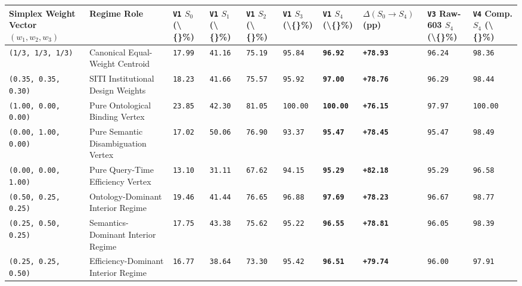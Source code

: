 \documentclass[10pt,a4paper]{article}
\begin{document}
{\scriptsize
\begin{longtable}{p{}p{}p{}p{}p{}p{}p{}p{}p{}p{}}
\toprule
\textbf{Simplex Weight Vector $(w_1, w_2, w_3)$} & \textbf{Regime Role} & \textbf{\texttt{V1} $S_0$ (\textbackslash\{\}\%)} & \textbf{\texttt{V1} $S_1$ (\textbackslash\{\}\%)} & \textbf{\texttt{V1} $S_2$ (\textbackslash\{\}\%)} & \textbf{\texttt{V1} $S_3$ (\textbackslash\{\}\%)} & \textbf{\texttt{V1} $S_4$ (\textbackslash\{\}\%)} & \textbf{$\Delta(S_0 \to S_4)$ (pp)} & \textbf{\texttt{V3} Raw-603 $S_4$ (\textbackslash\{\}\%)} & \textbf{\texttt{V4} Comp. $S_4$ (\textbackslash\{\}\%)} \\
\midrule
\endhead
\texttt{(1/3, 1/3, 1/3)} & Canonical Equal-Weight Centroid & \texttt{17.99} & \texttt{41.16} & \texttt{75.19} & \texttt{95.84} & \textbf{\texttt{96.92}} & \textbf{\texttt{+78.93}} & \texttt{96.24} & \texttt{98.36} \\
\texttt{(0.35, 0.35, 0.30)} & SITI Institutional Design Weights & \texttt{18.23} & \texttt{41.66} & \texttt{75.57} & \texttt{95.92} & \textbf{\texttt{97.00}} & \textbf{\texttt{+78.76}} & \texttt{96.29} & \texttt{98.44} \\
\texttt{(1.00, 0.00, 0.00)} & Pure Ontological Binding Vertex & \texttt{23.85} & \texttt{42.30} & \texttt{81.05} & \texttt{100.00} & \textbf{\texttt{100.00}} & \textbf{\texttt{+76.15}} & \texttt{97.97} & \texttt{100.00} \\
\texttt{(0.00, 1.00, 0.00)} & Pure Semantic Disambiguation Vertex & \texttt{17.02} & \texttt{50.06} & \texttt{76.90} & \texttt{93.37} & \textbf{\texttt{95.47}} & \textbf{\texttt{+78.45}} & \texttt{95.47} & \texttt{98.49} \\
\texttt{(0.00, 0.00, 1.00)} & Pure Query-Time Efficiency Vertex & \texttt{13.10} & \texttt{31.11} & \texttt{67.62} & \texttt{94.15} & \textbf{\texttt{95.29}} & \textbf{\texttt{+82.18}} & \texttt{95.29} & \texttt{96.58} \\
\texttt{(0.50, 0.25, 0.25)} & Ontology-Dominant Interior Regime & \texttt{19.46} & \texttt{41.44} & \texttt{76.65} & \texttt{96.88} & \textbf{\texttt{97.69}} & \textbf{\texttt{+78.23}} & \texttt{96.67} & \texttt{98.77} \\
\texttt{(0.25, 0.50, 0.25)} & Semantics-Dominant Interior Regime & \texttt{17.75} & \texttt{43.38} & \texttt{75.62} & \texttt{95.22} & \textbf{\texttt{96.55}} & \textbf{\texttt{+78.81}} & \texttt{96.05} & \texttt{98.39} \\
\texttt{(0.25, 0.25, 0.50)} & Efficiency-Dominant Interior Regime & \texttt{16.77} & \texttt{38.64} & \texttt{73.30} & \texttt{95.42} & \textbf{\texttt{96.51}} & \textbf{\texttt{+79.74}} & \texttt{96.00} & \texttt{97.91} \\
\bottomrule
\end{longtable}
}
\end{document}

